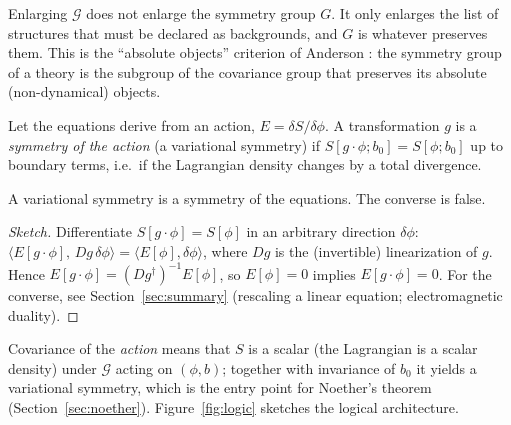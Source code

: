 \begin{remark}\label{rem:smaller}
Enlarging $\mathcal G$ does not enlarge the symmetry group $G$. It only
enlarges the list of structures that must be declared as backgrounds, and $G$
is whatever preserves them. This is the ``absolute objects'' criterion of
Anderson \cite{anderson}: the symmetry group of a theory is the subgroup of
the covariance group that preserves its absolute (non-dynamical) objects.
\end{remark}

\begin{definition}\label{def:variational}
Let the equations derive from an action, $E=\delta S/\delta\phi$. A
transformation $g$ is a \emph{symmetry of the action} (a variational
symmetry) if $S[g\cdot\phi;b_0]=S[\phi;b_0]$ up to boundary terms, i.e.\ if
the Lagrangian density changes by a total divergence.
\end{definition}

\begin{proposition}\label{prop:variational}
A variational symmetry is a symmetry of the equations. The converse is false.
\end{proposition}
\begin{proof}[Sketch]
Differentiate $S[g\cdot\phi]=S[\phi]$ in an arbitrary direction $\delta\phi$:
$\langle E[g\cdot\phi],\,Dg\,\delta\phi\rangle=\langle E[\phi],\delta\phi\rangle$,
where $Dg$ is the (invertible) linearization of $g$. Hence
$E[g\cdot\phi]=(Dg^{\dagger})^{-1}E[\phi]$, so $E[\phi]=0$ implies
$E[g\cdot\phi]=0$. For the converse, see Section~\ref{sec:summary} (rescaling
a linear equation; electromagnetic duality).
\end{proof}

Covariance of the \emph{action} means that $S$ is a scalar (the Lagrangian
is a scalar density) under $\mathcal G$ acting on $(\phi,b)$; together with
invariance of $b_0$ it yields a variational symmetry, which is the entry
point for Noether's theorem (Section~\ref{sec:noether}). Figure~\ref{fig:logic}
sketches the logical architecture.

